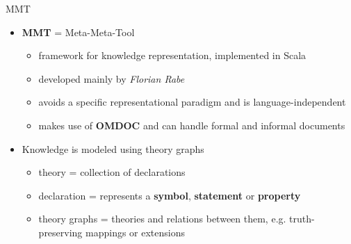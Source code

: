 \documentclass{beamer}
\begin{document}
    \begin{frame}[fragile]{MMT}
        \begin{itemize}
            \item \textbf{MMT} = Meta-Meta-Tool
            \begin{itemize}
                \item framework for knowledge representation, implemented in Scala
                \item developed mainly by \textit{Florian Rabe}
                \item avoids a specific representational paradigm and is language-independent
                \item makes use of \textbf{OMDOC} and can handle formal and informal documents
            \end{itemize}
            \item Knowledge is modeled using theory graphs
            \begin{itemize}
                \item theory = collection of declarations 
                \item declaration = represents a \textbf{symbol}, \textbf{statement} or \textbf{property}
                \item theory graphs = theories and relations between them, e.g. truth-preserving mappings or extensions
            \end{itemize}
        \end{itemize}
        
    \end{frame}
\end{document}
